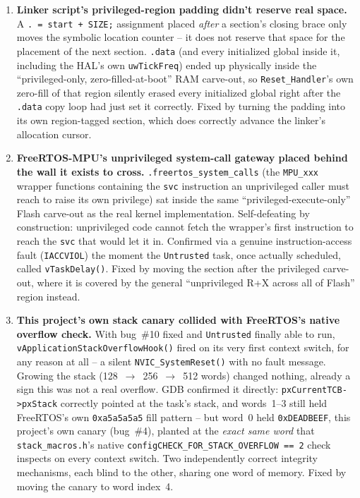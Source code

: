 \documentclass[sigconf,nonacm]{acmart}
\begin{document}
\begin{enumerate}
  \item \textbf{Linker script's privileged-region padding didn't reserve real space.} A \texttt{. = start + SIZE;} assignment placed \emph{after} a section's closing brace only moves the symbolic location counter -- it does not reserve that space for the placement of the next section. \texttt{.data} (and every initialized global inside it, including the HAL's own \texttt{uwTickFreq}) ended up physically inside the ``privileged-only, zero-filled-at-boot'' RAM carve-out, so \texttt{Reset\_Handler}'s own zero-fill of that region silently erased every initialized global right after the \texttt{.data} copy loop had just set it correctly. Fixed by turning the padding into its own region-tagged section, which does correctly advance the linker's allocation cursor.
  \item \textbf{FreeRTOS-MPU's unprivileged system-call gateway placed behind the wall it exists to cross.} \texttt{.freertos\_system\_calls} (the \texttt{MPU\_xxx} wrapper functions containing the \texttt{svc} instruction an unprivileged caller must reach to raise its own privilege) sat inside the same ``privileged-execute-only'' Flash carve-out as the real kernel implementation. Self-defeating by construction: unprivileged code cannot fetch the wrapper's first instruction to reach the \texttt{svc} that would let it in. Confirmed via a genuine instruction-access fault (\texttt{IACCVIOL}) the moment the \texttt{Untrusted} task, once actually scheduled, called \texttt{vTaskDelay()}. Fixed by moving the section after the privileged carve-out, where it is covered by the general ``unprivileged R+X across all of Flash'' region instead.
  \item \textbf{This project's own stack canary collided with FreeRTOS's native overflow check.} With bug~\#10 fixed and \texttt{Untrusted} finally able to run, \texttt{vApplicationStackOverflowHook()} fired on its very first context switch, for any reason at all -- a silent \texttt{NVIC\_SystemReset()} with no fault message. Growing the stack (128~$\rightarrow$~256~$\rightarrow$~512 words) changed nothing, already a sign this was not a real overflow. GDB confirmed it directly: \texttt{pxCurrentTCB->pxStack} correctly pointed at the task's stack, and words~1--3 still held FreeRTOS's own \texttt{0xa5a5a5a5} fill pattern -- but word~0 held \texttt{0xDEADBEEF}, this project's own canary (bug~\#4), planted at the \emph{exact same word} that \texttt{stack\_macros.h}'s native \texttt{configCHECK\_FOR\_STACK\_OVERFLOW == 2} check inspects on every context switch. Two independently correct integrity mechanisms, each blind to the other, sharing one word of memory. Fixed by moving the canary to word index~4.
\end{enumerate}
\end{document}

